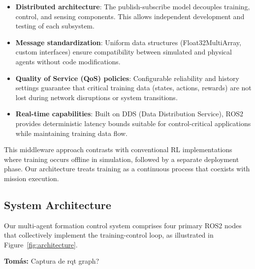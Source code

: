 \documentclass[preprint,3p]{elsarticle}
\newcommand{\tcom}[1]{{ \color{blue}\textbf{Tomás:} #1}}
\begin{document}
\begin{itemize}
    \item \textbf{Distributed architecture}: The publish-subscribe model decouples training, control, and sensing components. This allows independent development and testing of each subsystem.
    
    \item \textbf{Message standardization}: Uniform data structures (Float32MultiArray, custom interfaces) ensure compatibility between simulated and physical agents without code modifications.
    
    \item \textbf{Quality of Service (QoS) policies}: Configurable reliability and history settings guarantee that critical training data (states, actions, rewards) are not lost during network disruptions or system transitions.
    
    \item \textbf{Real-time capabilities}: Built on DDS (Data Distribution Service), ROS2 provides deterministic latency bounds suitable for control-critical applications while maintaining training data flow.
\end{itemize}

This middleware approach contrasts with conventional RL implementations where training occurs offline in simulation, followed by a separate deployment phase. Our architecture treats training as a continuous process that coexists with mission execution.

\subsection{System Architecture}

Our multi-agent formation control system comprises four primary ROS2 nodes that collectively implement the training-control loop, as illustrated in Figure~\ref{fig:architecture}. 

\tcom{Captura de rqt graph?}

\end{document}
